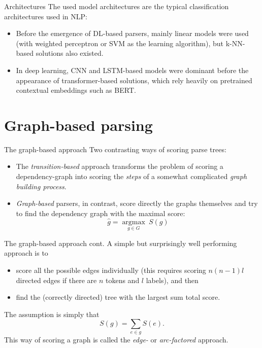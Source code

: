\documentclass[style=upen, size=14pt]{powerdot}
\newcommand{\gold}{\color{arany}}
\theoremstyle{definition}
\begin{document}
\begin{slide}[toc=]{Architectures}
  The used model architectures are the typical classification architectures used
  in NLP:
  \begin{itemize}
  \item Before the emergence of DL-based parsers, mainly linear models were used
    (with weighted perceptron or SVM as the learning algorithm), but k-NN-based
    solutions also existed.
  \item In deep learning, CNN and LSTM-based models were dominant before the
    appearance of transformer-based solutions, which rely heavily on pretrained
    contextual embeddings such as BERT.
  \end{itemize}
\end{slide}

\section{Graph-based parsing}

\begin{slide}[toc=Approach]{The graph-based approach}
  Two contrasting ways of scoring parse trees:
  \begin{itemize}
  \item The \emph{\gold transition-based} approach transforms the problem of
    scoring a dependency-graph into scoring the \emph{steps} of a somewhat
    complicated \emph{graph building process}.
  \item \emph{\gold Graph-based} parsers, in contrast, score directly the graphs
    themselves and try to find the dependency graph with the maximal score:
  $$\hat g =\underset{g\in G}{\operatorname{argmax}}~S(g)$$
  \end{itemize}
\end{slide}

\begin{slide}[toc=]{The graph-based approach cont.}
A simple but surprisingly well performing approach is to
\begin{itemize}
\item score all the possible edges individually (this requires scoring $n(n-1)l$
  directed edges if there are $n$ tokens and $l$ labels), and then
\item find the (correctly directed) tree with the largest sum total score.
\end{itemize}
The assumption is simply that
$$
S(g) = \sum_{e\in g} S(e).
$$
This way of scoring a graph is called the \emph{\gold edge-} or \emph{\gold
  arc-factored} approach.
\end{slide}
\end{document}
